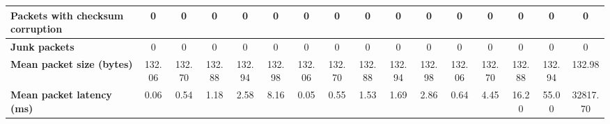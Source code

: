 \begin{table}[!h]
{\begin{tabular}{|l|ccccc|ccccc|ccccc|}
            \textbf{Packets with checksum corruption} & \multicolumn{1}{c|}{0} & \multicolumn{1}{c|}{0}
            & \multicolumn{1}{c|}{0}
            & \multicolumn{1}{c|}{0}
            & \multicolumn{1}{c|}{0}
            & \multicolumn{1}{c|}{0}
            & \multicolumn{1}{c|}{0}
            & \multicolumn{1}{c|}{0}
            & \multicolumn{1}{c|}{0}
            & \multicolumn{1}{c|}{0}
            & \multicolumn{1}{c|}{0}
            & \multicolumn{1}{c|}{0}
            & \multicolumn{1}{c|}{0}
            & \multicolumn{1}{c|}{0}
            & \multicolumn{1}{c|}{0}
            \\ \hline
            \textbf{Junk packets} & \multicolumn{1}{c|}{0} & \multicolumn{1}{c|}{0}
            & \multicolumn{1}{c|}{0}
            & \multicolumn{1}{c|}{0}
            & \multicolumn{1}{c|}{0}
            & \multicolumn{1}{c|}{0}
            & \multicolumn{1}{c|}{0}
            & \multicolumn{1}{c|}{0}
            & \multicolumn{1}{c|}{0}
            & \multicolumn{1}{c|}{0}
            & \multicolumn{1}{c|}{0}
            & \multicolumn{1}{c|}{0}
            & \multicolumn{1}{c|}{0}
            & \multicolumn{1}{c|}{0}
            & \multicolumn{1}{c|}{0}
            \\ \hline
            \textbf{Mean packet size (bytes)} & \multicolumn{1}{c|}{132.06} & \multicolumn{1}{c|}{132.70}
            & \multicolumn{1}{c|}{132.88}
            & \multicolumn{1}{c|}{132.94}
            & \multicolumn{1}{c|}{132.98}
            & \multicolumn{1}{c|}{132.06}
            & \multicolumn{1}{c|}{132.70}
            & \multicolumn{1}{c|}{132.88}
            & \multicolumn{1}{c|}{132.94}
            & \multicolumn{1}{c|}{132.98}
            & \multicolumn{1}{c|}{132.06}
            & \multicolumn{1}{c|}{132.70}
            & \multicolumn{1}{c|}{132.88}
            & \multicolumn{1}{c|}{132.94}
            & \multicolumn{1}{c|}{132.98}
            \\ \hline
            \textbf{Mean packet latency (ms)} & \multicolumn{1}{c|}{0.06} & \multicolumn{1}{c|}{0.54}
            & \multicolumn{1}{c|}{1.18}
            & \multicolumn{1}{c|}{2.58}
            & \multicolumn{1}{c|}{8.16}
            & \multicolumn{1}{c|}{0.05}
            & \multicolumn{1}{c|}{0.55}
            & \multicolumn{1}{c|}{1.53}
            & \multicolumn{1}{c|}{1.69}
            & \multicolumn{1}{c|}{2.86}
            & \multicolumn{1}{c|}{0.64}
            & \multicolumn{1}{c|}{4.45}
            & \multicolumn{1}{c|}{16.20}
            & \multicolumn{1}{c|}{55.00}
            & \multicolumn{1}{c|}{32817.70}

\end{tabular}}
\end{table}
